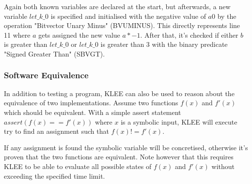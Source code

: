 Again both known variables are declared at the start, but afterwards, a new variable $let\_k\_0$ is specified and initialised with the negative value of $a0$ by the operation "Bitvector Unary Minus" (BVUMINUS). This directly represents line 11 where $a$ gets assigned the new value $a*-1$.
After that, it's checked if either $b$ is greater than $let\_k\_0$ or $let\_k\_0$ is greater than $3$ with the binary predicate "Signed Greater Than" (SBVGT).

\subsubsection{Software Equivalence}\label{section:software_equivalence}
In addition to testing a program, KLEE can also be used to reason about the equivalence of two implementations. Assume two functions $f(x)$ and $f'(x)$ which should be equivalent. With a simple assert statement $assert(f(x) == f'(x))$ where $x$ is a symbolic input, KLEE will execute try to find an assignment such that $f(x) != f'(x)$.

If any assignment is found the symbolic variable will be concretised, otherwise it's proven that the two functions are equivalent. Note however that this requires KLEE to be able to evaluate all possible states of $f(x)$ and $f'(x)$ without exceeding the specified time limit.
